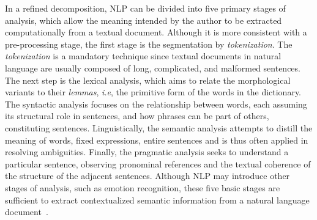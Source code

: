 \documentclass{ieeeaccess}
\begin{document}
In a refined decomposition, NLP can be divided into five primary stages of analysis, which allow the meaning intended by the author to be extracted computationally from a textual document. Although it is more consistent with a pre-processing stage, the first stage is the segmentation by \textit{tokenization}. The \textit{tokenization} is a mandatory technique since textual documents in natural language are usually composed of long, complicated, and malformed sentences. The next step is the lexical analysis, which aims to relate the morphological variants to their \textit{lemmas}, \textit{i.e}, the primitive form of the words in the dictionary. The syntactic analysis focuses on the relationship between words, each assuming its structural role in sentences, and how phrases can be part of others, constituting sentences. Linguistically, the semantic analysis attempts to distill the meaning of words, fixed expressions, entire sentences and is thus often applied in resolving ambiguities. Finally, the pragmatic analysis seeks to understand a particular sentence, observing pronominal references %
and the textual coherence of the structure of the adjacent sentences. Although NLP may introduce other stages of analysis, such as emotion recognition, these five basic stages are sufficient to extract contextualized semantic information from a natural language document~\cite{dale2010}.



\end{document}
